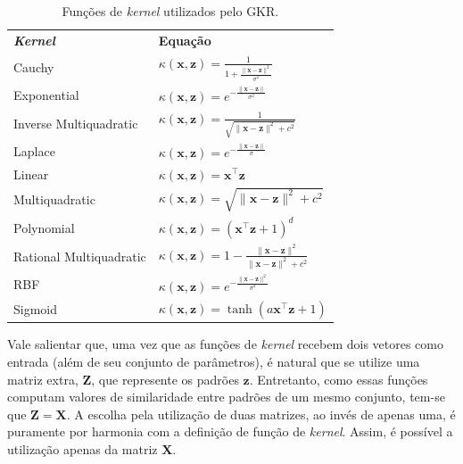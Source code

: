 \begin{table}[H]
    \caption{Funções de \textit{kernel} utilizados pelo GKR.}
    \begin{center} \label{tab:gkr-kernels}
        {
        \def\arraystretch{1.8}\tabcolsep=10pt
        \begin{tabular}{l@{\hskip 18pt}l}
            \hline\noalign{\smallskip}
            \textbf{\textit{Kernel}} & \textbf{Equação} \\
            \noalign{\smallskip}
            \hline
            \noalign{\smallskip}
            Cauchy 		            & $\kappa(\mathbf{x},\mathbf{z}) = \frac{1}{1 + \frac{\|\mathbf{x} - \mathbf{z}\|^2}{\sigma^2}}$ \\
            Exponential             & $\kappa(\mathbf{x},\mathbf{z}) = e^{-\frac{\|\mathbf{x} - \mathbf{z}\|}{\sigma^2}}$ \\
            Inverse Multiquadratic  & $\kappa(\mathbf{x},\mathbf{z}) = \frac{1}{\sqrt{\|\mathbf{x} - \mathbf{z}\|^2 + c^2}}$ \\
            Laplace		            & $\kappa(\mathbf{x},\mathbf{z}) = e^{-\frac{\|\mathbf{x} - \mathbf{z}\|}{\sigma}}$ \\
            Linear		            & $\kappa(\mathbf{x},\mathbf{z}) = \mathbf{x}^{\top}\mathbf{z}$ \\
            Multiquadratic          & $\kappa(\mathbf{x},\mathbf{z}) = \sqrt{\|\mathbf{x} - \mathbf{z}\|^2 + c^2}$ \\
            Polynomial	            & $\kappa(\mathbf{x},\mathbf{z}) = (\mathbf{x}^{\top}\mathbf{z} + 1)^d$ \\
            Rational Multiquadratic & $\kappa(\mathbf{x},\mathbf{z}) = 1 - \frac{\|\mathbf{x} - \mathbf{z}\|^2}{\|\mathbf{x} - \mathbf{z}\|^2 + c^2}$ \\
            RBF	                    & $\kappa(\mathbf{x},\mathbf{z}) = e^{-\frac{\|\mathbf{x} - \mathbf{z}\|^2}{\sigma^2}}$ \\
            Sigmoid         		& $\kappa(\mathbf{x},\mathbf{z}) = \tanh(a\mathbf{x}^{\top}\mathbf{z} + 1)$ \\
            \hline
        \end{tabular}
    }
    \end{center}
    \begin{center}
    \end{center}
\end{table}

Vale salientar que, uma vez que as funções de \textit{kernel} recebem dois vetores como entrada (além de seu conjunto de parâmetros), é natural que se utilize uma matriz extra, $\mathbf{Z}$, que represente os padrões $\mathbf{z}$. Entretanto, como essas funções computam valores de similaridade entre padrões de um mesmo conjunto, tem-se que $\mathbf{Z} = \mathbf{X}$. A escolha pela utilização de duas matrizes, ao invés de apenas uma, é puramente por harmonia com a definição de função de \textit{kernel}. Assim, é possível a utilização apenas da matriz $\mathbf{X}$.

